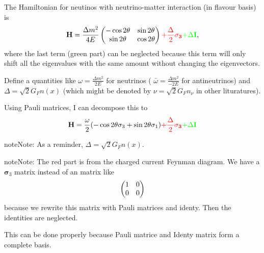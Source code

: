 \documentclass[letterpaper,12pt,english]{sphinxmanual}
\begin{document}
The Hamiltonian for neutinos with neutrino-matter interaction (in flavour basis) is
\begin{gather}
\begin{split}\mathbf H = \frac{ \Delta m^2 }{4E}\begin{pmatrix} -\cos 2\theta & \sin 2\theta \\ \sin 2\theta & \cos 2\theta \end{pmatrix}  {\color{red} + \frac{\Delta}{2} \mathbf {\sigma_3}}  {\color{green}+ \Delta \mathbf I},\end{split}\notag
\end{gather}
where the last term (green part) can be neglected because this term will only shift all the eigenvalues with the same amount without changing the eigenvectors.

Define a quantities like \(\omega=\frac{ \Delta m^2 }{2E}\) for neutrinos ( \(\bar\omega = \frac{ \Delta m^2 }{-2E}\) for antineutrinos) and \(\Delta = \sqrt{2} G_F n(x)\) (which might be denoted by \(\nu = \sqrt{2}G_F n_\nu\) in other lituratures).

Using Pauli matrices, I can decompose this to
\begin{gather}
\begin{split}\mathbf H = \frac{\omega}{2}( -\cos2\theta \sigma_3 + \sin 2\theta \sigma_1 )   {\color{red} + \frac{\Delta}{2} \mathbf {\sigma_3}}  {\color{green}+ \Delta \mathbf I}\end{split}\notag
\end{gather}
\begin{notice}{note}{Note:}
As a reminder, \(\Delta = \sqrt{2}G_F n(x)\).
\end{notice}

\begin{notice}{note}{Note:}
The red part is from the charged current Feynman diagram. We have a \(\mathbf\sigma_3\) matrix instead of an matrix like
\begin{gather}
\begin{split}\begin{pmatrix}1 & 0 \\ 0 & 0 \end{pmatrix}\end{split}\notag
\end{gather}
because we rewrite this matrix with Pauli matrices and identy. Then the identities are neglected.

This can be done properly because Pauli matrice and Identy matrix form a complete basis.
\end{notice}
\end{document}
